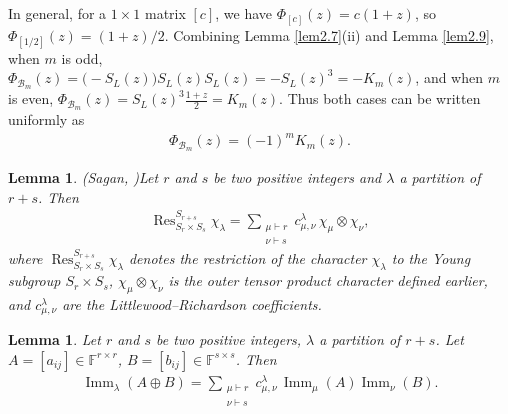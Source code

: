 \documentclass[11pt,a4paper]{article}
\newtheorem{lemma}[theorem]{Lemma}
\begin{document}
In general, for a $1\times1$ matrix $[c]$, we have $\Phi_{[c]}(z)=c(1+z)$, so $\Phi_{[1/2]}(z)=(1+z)/2$. Combining Lemma \ref{lem2.7}(ii) and Lemma \ref{lem2.9}, when $m$ is odd, $\Phi_{\mathcal B_m}(z)=\bigl(-S_L(z)\bigr)S_L(z)S_L(z)=-S_L(z)^3=-K_m(z)$,
and when $m$ is even,
$\Phi_{\mathcal B_m}(z)=S_L(z)^3\frac{1+z}{2}=K_m(z)$.
Thus both cases can be written uniformly as
\begin{eqnarray}\label{equ16}
  \Phi_{\mathcal B_m}(z)=(-1)^mK_m(z).
\end{eqnarray}

\begin{lemma}(Sagan, \cite{sag})\label{lem2.02}
Let $r$ and $s$ be two positive  integers and $\lambda$ a partition of $r+s$. Then
\begin{eqnarray*}
\operatorname{Res}^{S_{r+s}}_{S_r \times S_s} \chi_{\lambda}
= \sum_{\substack{\mu \vdash r \\ \nu \vdash s}}
  c_{\mu,\nu}^{\lambda} \,
  \chi_{\mu} \otimes \chi_{\nu},
\end{eqnarray*}
where $\operatorname{Res}^{S_{r+s}}_{S_r \times S_s}\chi_\lambda$ denotes the restriction of the character $\chi_\lambda$ to the Young subgroup $S_r\times S_s$, $\chi_{\mu}\otimes\chi_{\nu}$ is the outer tensor product character defined earlier, and $c_{\mu,\nu}^{\lambda}$ are the Littlewood–Richardson coefficients.
\end{lemma}

\begin{lemma}\label{lem2.4}
Let $r$ and $s$ be two positive  integers, $\lambda$ a partition of $r+s$. Let
$A=[a_{ij}]\in\mathbb{F}^{r\times r}$, $B=[b_{ij}]\in\mathbb{F}^{s\times s}$.
Then
\begin{eqnarray*}
  \operatorname{Imm}_\lambda(A\oplus B)
  =\sum_{\substack{\mu\vdash r\\\nu\vdash s}}
    c_{\mu,\nu}^{\lambda}\,
    \operatorname{Imm}_\mu(A)\operatorname{Imm}_\nu(B).
\end{eqnarray*}
\end{lemma}
\end{document}
